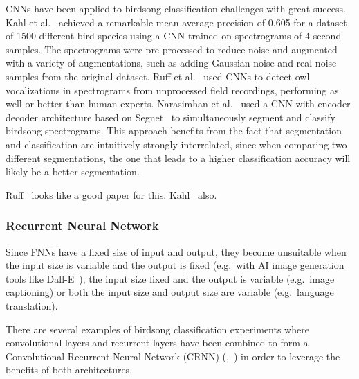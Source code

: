 CNNs have been applied to birdsong classification challenges with great success.
Kahl et al.~\cite{kahl2017large} achieved a remarkable mean average precision of
0.605 for a dataset of 1500 different bird species using a CNN trained on
spectrograms of 4 second samples. The spectrograms were pre-processed to reduce
noise and augmented with a variety of augmentations, such as adding Gaussian
noise and real noise samples from the original dataset. Ruff et
al.~\cite{ruff2020automated} used CNNs to detect owl vocalizations in
spectrograms from unprocessed field recordings, performing as well or better
than human experts. Narasimhan et al.~\cite{narasimhan2017simultaneous} used a
CNN with encoder-decoder architecture based on
Segnet~\cite{badrinarayanan2017segnet} to simultaneously segment and classify
birdsong spectrograms. This approach benefits from the fact that segmentation
and classification are intuitively strongly interrelated, since when comparing
two different segmentations, the one that leads to a higher classification
accuracy will likely be a better segmentation.

Ruff~\cite{ruff2020automated} looks like a good paper for this.
Kahl~\cite{kahl2017large} also.

\subsubsection{Recurrent Neural Network}

Since FNNs have a fixed size of input and output, they become unsuitable when
the input size is variable and the output is fixed (e.g.\ with AI image
generation tools like Dall-E~\cite{ramesh2021zero}), the input size fixed and
the output is variable (e.g.\ image captioning) or both the input size and
output size are variable (e.g.\ language translation).

There are several examples of birdsong classification experiments where
convolutional layers and recurrent layers have been combined to form a
Convolutional Recurrent Neural Network (CRNN)
(\cite{yan2021birdsong},~\cite{mukherjee2018convolutional}) in order to leverage
the benefits of both architectures.
